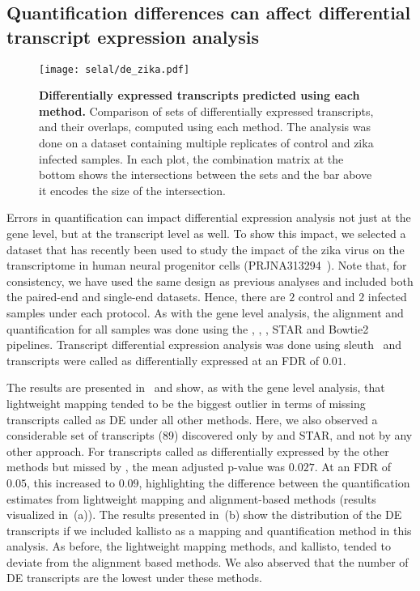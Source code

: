 \subsection{Quantification differences can affect differential transcript expression analysis}
\label{sec:DTE}

\begin{figure}[ht!]
	\centering
	\texttt{[image: selal/de\_zika.pdf]}
    \caption{\textbf{Differentially expressed transcripts predicted using each method.} 
    Comparison of sets of differentially expressed transcripts, and their overlaps, computed using each method.
    The analysis was done on a dataset containing multiple replicates of control and zika infected samples.
 	In each plot, the combination matrix at the bottom shows the intersections between the sets and the bar above
      it encodes the size of the intersection.}
    \label{fig:dte}
\end{figure}

Errors in quantification can impact differential expression analysis not just at the gene level, 
but at the transcript level as well. To show this impact, we selected a dataset that has recently been 
used to study the impact of the zika virus on the transcriptome in human neural progenitor cells (PRJNA313294~\citep{tang2016zika}). 
Note that, for consistency, we have used the same design as previous analyses and included both the
paired-end and single-end datasets. Hence, there are $2$ control and $2$ infected samples under
each protocol. As with the gene level analysis, the alignment and quantification for all samples was done using the \hsa, \saf, \qm, 
STAR and Bowtie2 pipelines. Transcript differential expression analysis was done using sleuth~\citep{pimentel2017differential} and 
transcripts were called as differentially expressed at an FDR of $0.01$. 

The results are presented in~ and
show, as with the gene level analysis, that lightweight mapping tended to be the biggest outlier in terms of 
missing transcripts called as DE under all other methods.  Here, we also observed a considerable 
set of transcripts (89) discovered only by \saf and STAR, and not by any other approach. 
For transcripts called as differentially expressed by the other methods but 
missed by \qm, the mean adjusted p-value was $0.027$. At an FDR of $0.05$, this increased to 
$0.09$, highlighting the difference between the quantification estimates from lightweight mapping
and alignment-based methods (results visualized in~(a)). The results presented 
in~(b) show the distribution of the DE transcripts if we included kallisto as a
mapping and quantification method in this analysis. As before, the lightweight mapping methods, \qm and
kallisto, tended to deviate from the alignment based methods. We also abserved that the number of DE transcripts
are the lowest under these methods. 

